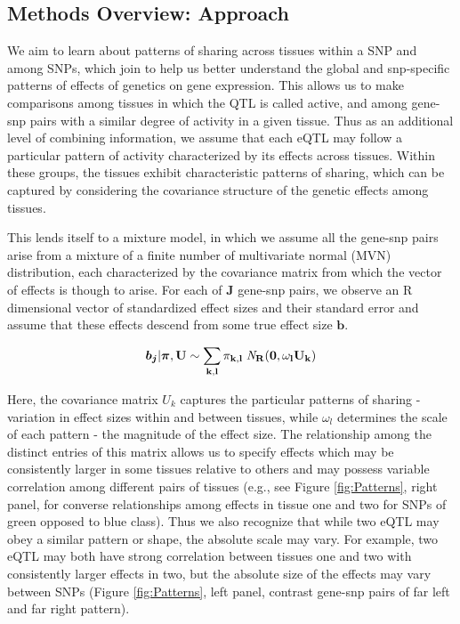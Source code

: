 \subsection{Methods Overview: Approach} 

We aim to learn about patterns of sharing across tissues within a SNP and among SNPs, which join to help us better understand the global and snp-specific patterns of effects of genetics on gene expression. 
This allows us to make comparisons among tissues in which the QTL is called active, and among gene-snp pairs with a similar degree of activity in a given tissue. 
Thus as an additional level of combining information, we assume that each eQTL may follow a particular pattern of activity characterized by its effects across tissues. Within these groups, the tissues exhibit characteristic patterns of sharing, which can be captured by considering the covariance structure of the genetic effects among tissues. 

This lends itself to a mixture model, in which  we assume all the gene-snp pairs arise from a mixture of a finite number of multivariate normal (MVN) distribution, each characterized by the covariance matrix from which the vector of effects is though to arise. For each of $\textbf{J}$ gene-snp pairs, we observe an R dimensional vector of standardized effect sizes %
and their standard error and assume that these effects descend from some true effect size $\bm{b}$. 



 \begin{equation}
  \bm{b_{j}} | \bm{\pi},\bf{U} \sim \sum_{k,l} \pi_{k,l} \;{\it N}_R(\bm{0}, \omega_l U_{k})
  \label{eqn:mixprior}
\end{equation}

Here, the covariance matrix $U_{k}$ captures the particular patterns of sharing - variation in effect sizes within and between tissues, while $\omega_{l}$ determines the scale of each pattern - the magnitude of the effect size. The relationship among the distinct entries of this matrix allows us to specify effects which may be consistently larger in some tissues relative to others and may possess variable correlation among different pairs of tissues (e.g., see Figure \ref{fig:Patterns}, right panel, for converse relationships among effects in tissue one and two for SNPs of green opposed to blue class). Thus we also recognize that while two eQTL may obey a similar pattern or shape, the absolute scale may vary. For example, two eQTL may both have strong correlation between tissues one and two with consistently larger effects in two, but the absolute size of the effects may vary between SNPs (Figure \ref{fig:Patterns}, left panel, contrast gene-snp pairs of far left and far right pattern).\newline

